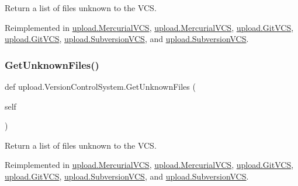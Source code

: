 \begin{DoxyVerb}Return a list of files unknown to the VCS.\end{DoxyVerb}
 

Reimplemented in \mbox{\hyperlink{classupload_1_1MercurialVCS_a6190899fb86cd09ad84cc5d4b0ebd2f3}{upload.\+Mercurial\+V\+CS}}, \mbox{\hyperlink{classupload_1_1MercurialVCS_a6190899fb86cd09ad84cc5d4b0ebd2f3}{upload.\+Mercurial\+V\+CS}}, \mbox{\hyperlink{classupload_1_1GitVCS_ae4e8c0e9fa01619c6a5c76d1ab84b995}{upload.\+Git\+V\+CS}}, \mbox{\hyperlink{classupload_1_1GitVCS_ae4e8c0e9fa01619c6a5c76d1ab84b995}{upload.\+Git\+V\+CS}}, \mbox{\hyperlink{classupload_1_1SubversionVCS_a494ba1010992d83cac015bc396ab693a}{upload.\+Subversion\+V\+CS}}, and \mbox{\hyperlink{classupload_1_1SubversionVCS_a494ba1010992d83cac015bc396ab693a}{upload.\+Subversion\+V\+CS}}.

\mbox{\label{classupload_1_1VersionControlSystem_a56a60e56aa9aff3df4001d2f84cab884}} 
\subsubsection{\texorpdfstring{GetUnknownFiles()}{GetUnknownFiles()}\hspace{0.1cm}{\footnotesize\ttfamily [2/2]}}
{\footnotesize\ttfamily def upload.\+Version\+Control\+System.\+Get\+Unknown\+Files (\begin{DoxyParamCaption}\item[{}]{self }\end{DoxyParamCaption})}

\begin{DoxyVerb}Return a list of files unknown to the VCS.\end{DoxyVerb}
 

Reimplemented in \mbox{\hyperlink{classupload_1_1MercurialVCS_a6190899fb86cd09ad84cc5d4b0ebd2f3}{upload.\+Mercurial\+V\+CS}}, \mbox{\hyperlink{classupload_1_1MercurialVCS_a6190899fb86cd09ad84cc5d4b0ebd2f3}{upload.\+Mercurial\+V\+CS}}, \mbox{\hyperlink{classupload_1_1GitVCS_ae4e8c0e9fa01619c6a5c76d1ab84b995}{upload.\+Git\+V\+CS}}, \mbox{\hyperlink{classupload_1_1GitVCS_ae4e8c0e9fa01619c6a5c76d1ab84b995}{upload.\+Git\+V\+CS}}, \mbox{\hyperlink{classupload_1_1SubversionVCS_a494ba1010992d83cac015bc396ab693a}{upload.\+Subversion\+V\+CS}}, and \mbox{\hyperlink{classupload_1_1SubversionVCS_a494ba1010992d83cac015bc396ab693a}{upload.\+Subversion\+V\+CS}}.

